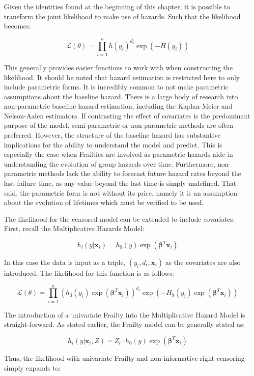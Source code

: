 Given the identities found at the beginning of this chapter, it is possible to transform the joint likelihood to make use of hazards.  Such that the likelihood becomes:

$$ \mathcal {L}(\theta) = \prod^n_{i=1} h(y_i)^{d_i} \exp(-H(y_i)) $$

This generally provides easier functions to work with when constructing the likelihood. It should be noted that hazard estimation is restricted here to only include parametric forms. It is incredibly common to not make parametric assumptions about the baseline hazard. There is a large body of research into non-parametric baseline hazard estimation, including the Kaplan-Meier and Nelson-Aalen estimators. If contrasting the effect of covariates is the predominant purpose of the model, semi-parametric or non-parametric methods are often preferred. However, the structure of the baseline hazard has substantive implications for the ability to understand the model and predict. This is especially the case when Frailties are involved as parametric hazards aide in understanding the evolution of group hazards over time. Furthermore, non-parametric methods lack the ability to forecast future hazard rates beyond the last failure time, as any value beyond the last time is simply undefined. That said, the parametric form is not without its price, namely it is an assumption about the evolution of lifetimes which must be verified to be used.

The likelihood for the censored model can be extended to include covariates. First, recall the Multiplicative Hazards Model:

$$ h_i(y|\textbf{x}_i) = h_0(y) \exp(\boldsymbol\beta^T \textbf{x}_i) $$

In this case the data is input as a triple, $(y_i, d_i, \textbf{x}_i)$ as the covariates are also introduced. The likelihood for this function is as follows:

$$ \mathcal {L}(\theta) = \prod^n_{i=1} \left (h_0(y_i) \exp(\boldsymbol\beta^T \textbf{x}_i)  \right )^{d_i} \exp(-H_0(y_i) \exp(\boldsymbol\beta^T \textbf{x}_i)) $$

The introduction of a univariate Frailty into the Multiplicative Hazard Model is straight-forward. As stated earlier, the Frailty model can be generally stated as:

$$ h_{i}(y|\textbf{x}_i, Z) = Z_i \cdot h_0(y) \exp(\boldsymbol\beta^T \textbf{x}_{i})  $$

Thus, the likelihood with univariate Frailty and non-informative right censoring simply expands to:

